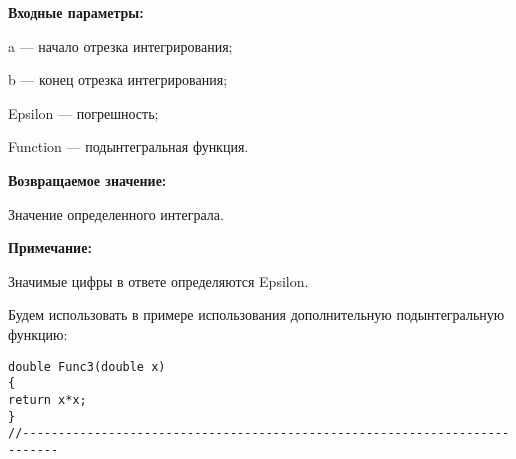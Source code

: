 \textbf{Входные параметры:}

 a --- начало отрезка интегрирования;
 
 b --- конец отрезка интегрирования;
 
 Epsilon --- погрешность;
 
 Function --- подынтегральная функция.

\textbf{Возвращаемое значение:}
 
 Значение определенного интеграла.
 
 \textbf{Примечание:}
 
 Значимые цифры в ответе определяются Epsilon.

Будем использовать в примере использования дополнительную подынтегральную функцию:

\begin{lstlisting}[caption=Дополнительная функция]
double Func3(double x)
{
return x*x;
}
//---------------------------------------------------------------------------
\end{lstlisting}
